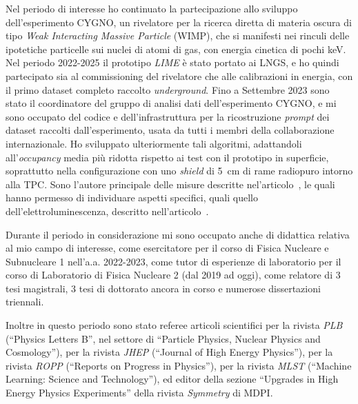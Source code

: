 \documentclass[a4paper,12pt,twoside]{article}
\begin{document}
{Nel periodo di interesse ho continuato la partecipazione allo sviluppo
dell'esperimento CYGNO, un rivelatore per la ricerca diretta di
materia oscura di tipo \textit{Weak Interacting Massive Particle}
(WIMP), che si manifesti nei rinculi delle ipotetiche particelle sui
nuclei di atomi di gas, con energia cinetica di pochi keV. Nel periodo
2022-2025 il prototipo {\it LIME} \`e stato portato ai LNGS, 
e ho quindi partecipato sia al commissioning
del rivelatore che alle calibrazioni in energia, con il primo dataset
completo raccolto {\it underground}.  Fino a Settembre 2023 sono stato
il coordinatore del gruppo di analisi dati dell'esperimento CYGNO, e
mi sono occupato del codice e dell'infrastruttura per la ricostruzione
{\it prompt} dei dataset raccolti dall'esperimento, usata da tutti i
membri della collaborazione internazionale. Ho sviluppato
ulteriormente tali algoritmi, adattandoli all'{\it occupancy} media
pi\`u ridotta rispetto ai test con il prototipo in superficie,
soprattutto nella configurazione con uno {\it shield} di \SI{5}{cm} di
rame radiopuro intorno alla TPC. Sono l'autore principale delle misure
descritte nel'articolo~, le quali hanno permesso di individuare aspetti specifici, quali quello dell'elettroluminescenza, descritto nell'articolo~.
 
Durante il periodo in considerazione mi sono occupato anche di
didattica relativa al mio campo di interesse, come esercitatore per il
corso di Fisica Nucleare e Subnucleare 1 nell'a.a. 2022-2023, come
tutor di esperienze di laboratorio per il corso di Laboratorio di
Fisica Nucleare 2 (dal 2019 ad oggi), come relatore di 3 tesi
magistrali, 3 tesi di dottorato ancora in corso e numerose
dissertazioni triennali.

Inoltre in questo periodo sono stato referee articoli scientifici per
la rivista \textit{PLB} (``Physics Letters B'', nel settore di ``Particle
Physics, Nuclear Physics and Cosmology''), per la rivista
\textit{JHEP} (``Journal of High Energy Physics''), per la rivista \textit{ROPP} (``Reports on Progress in Physics''), per la rivista \textit{MLST} (``Machine Learning: Science and
Technology''), ed editor della sezione ``Upgrades in High Energy
Physics Experiments'' della rivista \textit{Symmetry} di MDPI.

  
}


\citeall{*}
\end{document}
